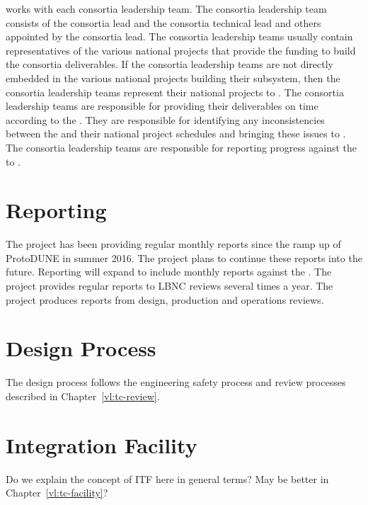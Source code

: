   works with each consortia leadership team. The
consortia leadership team consists of the consortia lead and the
consortia technical lead and others appointed by the consortia
lead. The consortia leadership teams usually contain representatives
of the various national projects that provide the funding to build the consortia
deliverables. If the consortia leadership teams are not directly
embedded in the various national projects building their subsystem,
then the consortia leadership teams represent their national projects
to . The consortia leadership teams are responsible for
providing their deliverables on time according to the
. They are responsible for identifying any inconsistencies
between the  and their national project schedules and
bringing these issues to . The consortia leadership teams
are responsible for reporting progress against the  to
.

\section{Reporting}
\label{sec:fdsp-coord-reporting}

The  project has been providing regular monthly reports
since the ramp up of ProtoDUNE in summer 2016. The project plans to
continue these reports into the future. Reporting will expand to
include monthly reports against the . The 
project provides regular reports to LBNC reviews several times a
year. The  project produces reports from design,
production and operations reviews.



\section{Design Process}
\label{sec:fdsp-coord-designprocess}

The design process follows the engineering safety process and review
processes described in Chapter~\ref{vl:tc-review}.

\section{Integration Facility}
\label{sec:fdsp-coord-itf}

Do we explain the concept of ITF here in general terms? May be better
in Chapter~\ref{vl:tc-facility}?
